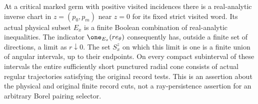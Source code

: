 \begin{lemma}
\label{lem:pf-sign-data}
At a critical marked germ with positive visited incidences there is
a real-analytic inverse chart in $z=(p_0,p_m)$ near $z=0$ for its
fixed strict visited word.  Its actual physical subset $E_x$ is a
finite Boolean combination of real-analytic inequalities.  The
indicator $\one_{E_x}(r e_\theta)$ consequently has, outside a
finite set of directions, a limit as $r\downarrow0$.  The set
$S_x^z$ on which this limit is one is a finite union of angular
intervals, up to their endpoints.  On every compact subinterval of
these intervals the entire sufficiently short punctured radial cone
consists of actual regular trajectories satisfying the original
record tests.  This is an assertion about the physical and original
finite record cuts, not a ray-persistence assertion for an arbitrary
Borel pairing selector.
\end{lemma}
